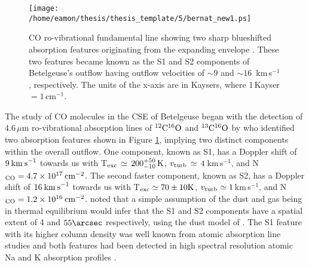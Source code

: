 \begin{figure}[!t]
\centering 
          \texttt{[image: /home/eamon/thesis/thesis\_template/5/bernat\_new1.ps]}
\caption[Bernat (1979) CO line profile showing two sharp line cores]{CO ro-vibrational fundamental line showing two sharp blueshifted absorption features originating from the expanding envelope \citep{bernat_1979}. These two features became known as the S1 and S2 components of Betelgeuse's outflow having outflow velocities of $\sim 9$ and $\sim 16$\, km\,s$^{-1}$, respectively. The units of the x-axis are in Kaysers, where 1\,Kayser\,$ = 1$\,cm$^{-1}$.}
\label{fig:5.1}
\end{figure}

The study of CO molecules in the CSE of Betelgeuse began with the detection of 4.6\,$\mu$m ro-vibrational absorption lines of $\rm{{}^{12}C^{16}O}$ and $\rm{{}^{13}C^{16}O}$ by \cite{bernat_1979} who identified two absorption features shown in Figure \ref{fig:5.1}, implying two distinct components within the overall outflow. One component, known as S1, has a Doppler shift of $9\>{\rm km\>s}^{-1}$ towards us with T$_{\rm{exc}}\,\simeq\,200^{+50}_{-10}\,\rm{K}$, $v_{\rm{turb}}\,\simeq\,4$\,km\,s${}^{-1}$, and N$_{\rm{CO}}=4.7\times 10^{17}\>{\rm cm}^{-2}$. The second faster component, known as S2, has a Doppler shift of $16\>{\rm km\>s}^{-1}$ towards us with T$_{\rm{exc}} \simeq 70 \pm 10 \rm{K}$, $v_{\rm{turb}}\simeq 1$\,km\,s${}^{-1}$, and N$_{\rm{CO}}=1.2\times 10^{16}\>{\rm cm}^{-2}$. \cite{bernat_1979} noted that a simple assumption of the dust and gas being in thermal equilibrium would infer that the S1 and S2 components have a spatial extent of 4 and $55\arcsec$ respectively, using the dust model of \cite{tsuji_1979}. The S1 feature with its higher column density was well known from atomic absorption line studies \citep[e.g.,][]{weymann_1962} and both features had been detected in high spectral resolution atomic Na and K absorption profiles \citep{goldberg_1975}.

